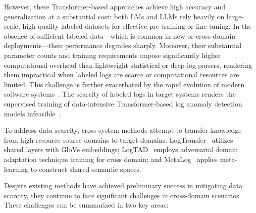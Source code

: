 \documentclass[lettersize,journal]{IEEEtran}
\begin{document}
However, these Transformer-based approaches achieve high accuracy and generalization at a substantial cost: both LMs and LLMs rely heavily on large-scale, high-quality labeled datasets for effective pre-training or fine-tuning. In the absence of sufficient labeled data—which is common in new or cross-domain deployments—their performance degrades sharply. Moreover, their substantial parameter counts and training requirements impose significantly higher computational overhead than lightweight statistical or deep-log parsers, rendering them impractical when labeled logs are scarce or computational resources are limited.
This challenge is further exacerbated by the rapid evolution of modern software systems~\cite{torrey2010transfer, ye2025logow}. The scarcity of labeled logs in target systems renders the supervised training of data-intensive Transformer-based log anomaly detection models infeasible~\cite{ye2025logow}. 

To address data scarcity, cross-system methods attempt to transfer knowledge from high-resource source domains to target domains. LogTransfer~\cite{chen2020logtransfer} utilizes shared layers with GloVe embeddings; LogTAD~\cite{han2021unsupervised} employs adversarial domain adaptation technique training for cross domain; and MetaLog~\cite{zhang2024metalog} applies meta-learning to construct shared semantic spaces.

Despite existing methods have achieved preliminary success in mitigating data scarcity, they continue to face significant challenges in cross-domain scenarios. These challenges can be summarized in two key areas:

\IEEEpubidadjcol
\end{document}
